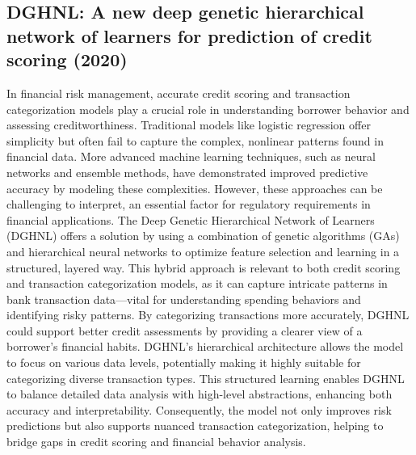 \documentclass[12pt,letterpaper]{article}
\begin{document}
\subsection{DGHNL: A new deep genetic hierarchical network of learners for prediction of credit scoring (2020)}

In financial risk management, accurate credit scoring and transaction categorization models play a crucial role in understanding borrower behavior and assessing creditworthiness. Traditional models like logistic regression offer simplicity but often fail to capture the complex, nonlinear patterns found in financial data. More advanced machine learning techniques, such as neural networks and ensemble methods, have demonstrated improved predictive accuracy by modeling these complexities. However, these approaches can be challenging to interpret, an essential factor for regulatory requirements in financial applications.
The Deep Genetic Hierarchical Network of Learners (DGHNL) offers a solution by using a combination of genetic algorithms (GAs) and hierarchical neural networks to optimize feature selection and learning in a structured, layered way. This hybrid approach is relevant to both credit scoring and transaction categorization models, as it can capture intricate patterns in bank transaction data—vital for understanding spending behaviors and identifying risky patterns. By categorizing transactions more accurately, DGHNL could support better credit assessments by providing a clearer view of a borrower’s financial habits.
DGHNL’s hierarchical architecture allows the model to focus on various data levels, potentially making it highly suitable for categorizing diverse transaction types. This structured learning enables DGHNL to balance detailed data analysis with high-level abstractions, enhancing both accuracy and interpretability. Consequently, the model not only improves risk predictions but also supports nuanced transaction categorization, helping to bridge gaps in credit scoring and financial behavior analysis.

\clearpage

\makereference



\cite{plawiak2020dghnl}
\cite{radford2019gpt2}
\cite{vaswani2023attention}
\end{document}
